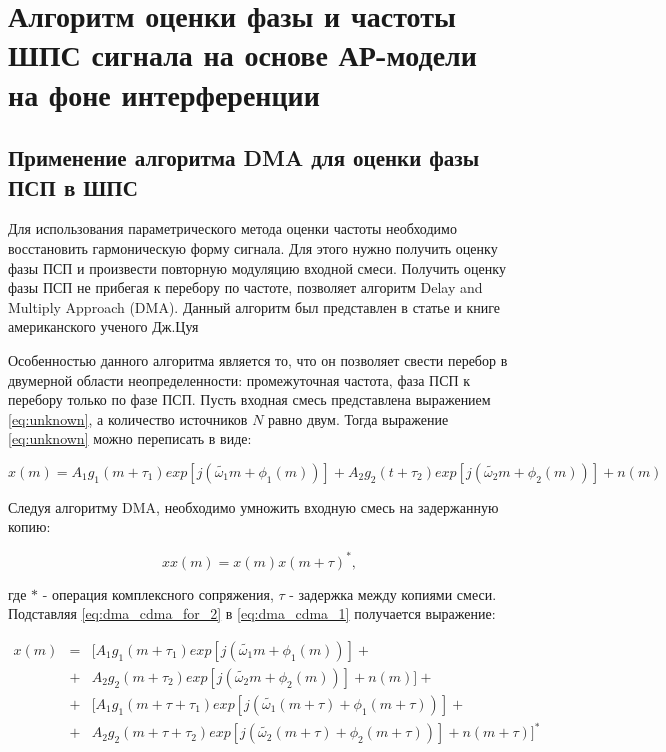 \chapter{Алгоритм оценки фазы и частоты ШПС сигнала на основе АР-модели на фоне интерференции}

\section{Применение алгоритма DMA для оценки фазы ПСП в ШПС}
\label{sec_dma_real}
Для использования параметрического метода оценки частоты необходимо восстановить гармоническую форму сигнала. Для этого
нужно получить оценку фазы ПСП и произвести повторную модуляцию входной смеси. Получить оценку фазы ПСП не прибегая к перебору по частоте,
позволяет алгоритм Delay and Multiply Approach (DMA). Данный алгоритм был представлен в статье и книге американского ученого Дж.Цуя \cite{lin_dma, tsui}

Особенностью данного алгоритма является то, что он позволяет свести перебор в двумерной области неопределенности:
промежуточная частота, фаза ПСП к перебору только по фазе ПСП.
Пусть входная смесь представлена выражением \ref{eq:unknown}, а количество источников ${N}$ равно двум. Тогда выражение \ref{eq:unknown} можно переписать в виде:
\begin{center}
\begin{equation}
	\label{eq:dma_cdma_for_2}
	x(m) =	A_1 g_1(m + \tau_1) exp \left[ j \left( \tilde{\omega_1} m + \phi_1 (m) \right) \right]
		+ A_2 g_2(t + \tau_2) exp \left[ j \left(  \tilde{\omega_2} m + \phi_2 (m) \right) \right] + n(m) 
\end{equation}
\end{center}

Следуя алгоритму DMA, необходимо умножить входную смесь на задержанную копию:
\begin{center}
\begin{equation}
	\label{eq:dma_cdma_1}
	xx(m) = x(m)x(m+\tau)^*,
\end{equation}
\end{center}
где ${*}$ - операция комплексного сопряжения, ${\tau}$ - задержка между копиями смеси. Подставляя \ref{eq:dma_cdma_for_2} в \ref{eq:dma_cdma_1} получается выражение:
\begin{center}
\begin{eqnarray}
	\label{eq:dma_cdma_2}
	x(m) & = &[ A_1 g_1(m + \tau_1) exp \left[ j \left( \tilde{\omega_1} m + \phi_1 (m) \right) \right] + \nonumber \\
	     & + & A_2 g_2(m + \tau_2) exp \left[ j \left(  \tilde{\omega_2} m + \phi_2 (m) \right) \right] + n(m) ] + \nonumber \\
	     & + & [A_1 g_1(m + \tau + \tau_1) exp \left[ j \left( \tilde{\omega_1} (m + \tau) + \phi_1 (m + \tau) \right) \right]  + \nonumber \\
	     & + & A_2 g_2(m + \tau + \tau_2) exp \left[ j \left(  \tilde{\omega_2} (m + \tau) + \phi_2 (m + \tau) \right) \right] + n(m + \tau)]^*
\end{eqnarray}
\end{center}

